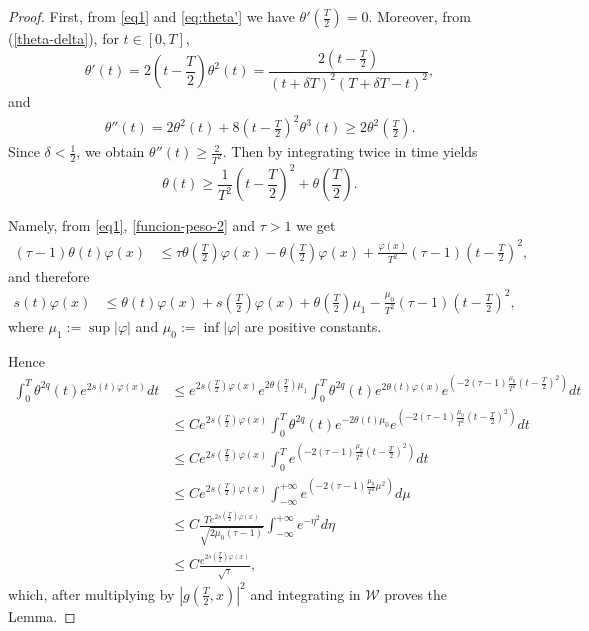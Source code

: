 \documentclass{amsart}
\numberwithin{equation}{section}
\begin{document}
\begin{proof}
    First, from \eqref{eq1} and \eqref{eq:theta'} we have $\theta'\left(\frac{T}{2}\right)=0$. Moreover, from (\ref{theta-delta}), for $t\in[0,T]$,
    \[ \theta'(t)=2\left(t-\frac{T}{2}\right)\theta^2(t)=\frac{2\left(t-\frac{T}{2}\right)}{(t+\delta T)^2(T+\delta T-t)^2}, \]
    and
    \begin{align*}
        \theta''(t)=2\theta^2(t)+8\left(t-\frac{T}{2}\right)^2\theta^3(t)\geq 2\theta^2\left(\frac{T}{2}\right).
    \end{align*}
    Since $\delta<\frac{1}{2}$, we obtain $\theta''(t)\geq \frac{2}{T^2}$. Then by integrating twice in time yields \[ \theta(t)\ge \frac{1}{T^2}\left(t-\frac{T}{2}\right)^2+\theta\left(\frac{T}{2}\right). \]

    Namely, from \eqref{eq1}, \eqref{funcion-peso-2} and $\tau>1$ we get
    \begin{align*}
        (\tau-1)\theta(t)\varphi(x)&\le \tau \theta\left(\frac{T}{2}\right)\varphi(x)-\theta\left(\frac{T}{2}\right)\varphi(x)+\frac{\varphi(x)}{T^2} (\tau-1)\left(t-\frac{T}{2}\right)^2,
    \end{align*}
    and therefore \begin{align*}
        s(t)\varphi(x)&\le \theta(t)\varphi(x)+s\left(\frac{T}{2}\right)\varphi(x)+\theta\left(\frac{T}{2}\right)\mu_1-\frac{\mu_0}{T^2} (\tau-1)\left(t-\frac{T}{2}\right)^2,
    \end{align*}
    where $\mu_1:= \sup |\varphi|$ and $\mu_0:= \inf|\varphi|$ are  positive constants.

    Hence
    \begin{align*}
        \int_0^T\theta^{2q}(t)e^{2s(t)\varphi(x)}dt&\le e^{2s\left(\frac{T}{2}\right)\varphi(x)}e^{2\theta\left(\frac{T}{2}\right)\mu_1}\int_0^T\theta^{2q}(t)e^{2\theta(t)\varphi(x)}e^{\left(-2(\tau-1)\frac{\mu_0}{T^2}\left(t-\frac{T}{2}\right)^2\right)}dt \\
        &\le Ce^{2s\left(\frac{T}{2}\right)\varphi(x)}\int_0^T\theta^{2q}(t)e^{-2\theta(t)\mu_0}e^{\left(-2(\tau-1)\frac{\mu_0}{T^2}\left(t-\frac{T}{2}\right)^2\right)}dt
        \\
        &\le Ce^{2s\left(\frac{T}{2}\right)\varphi(x)}\int_0^Te^{\left(-2(\tau-1)\frac{\mu_0}{T^2}\left(t-\frac{T}{2}\right)^2\right)}dt
        \\&
        \le Ce^{2s\left(\frac{T}{2}\right)\varphi(x)}\int_{-\infty}^{+\infty}e^{\left(-2(\tau-1)\frac{\mu_0}{T^2}\mu^2\right)}d\mu\\
        &\le C\frac{Te^{2s\left(\frac{T}{2}\right)\varphi(x)}}{\sqrt{2\mu_0(\tau-1)}}\int_{-\infty}^{+\infty}e^{-\eta^2}d\eta \\
        &\le C\frac{e^{2s\left(\frac{T}{2}\right)\varphi(x)}}{\sqrt{\tau}},
    \end{align*}
which, after multiplying by $\left|g\left(\frac{T}{2},x\right)\right|^2$ and integrating in ${\mathcal{W}}$ proves the Lemma.
\end{proof}
\end{document}
